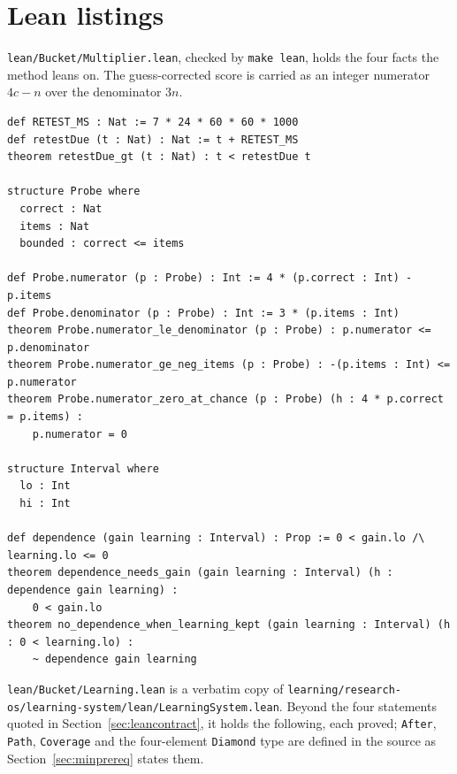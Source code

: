 \documentclass[11pt]{article}
\begin{document}

\section{Lean listings}
\label{app:lean}

\texttt{lean/Bucket/Multiplier.lean}, checked by \texttt{make lean}, holds the four facts the method leans on. The guess-corrected score is carried as an integer numerator $4c - n$ over the denominator $3n$.

\begin{lstlisting}[style=bucketlean]
def RETEST_MS : Nat := 7 * 24 * 60 * 60 * 1000
def retestDue (t : Nat) : Nat := t + RETEST_MS
theorem retestDue_gt (t : Nat) : t < retestDue t

structure Probe where
  correct : Nat
  items : Nat
  bounded : correct <= items

def Probe.numerator (p : Probe) : Int := 4 * (p.correct : Int) - p.items
def Probe.denominator (p : Probe) : Int := 3 * (p.items : Int)
theorem Probe.numerator_le_denominator (p : Probe) : p.numerator <= p.denominator
theorem Probe.numerator_ge_neg_items (p : Probe) : -(p.items : Int) <= p.numerator
theorem Probe.numerator_zero_at_chance (p : Probe) (h : 4 * p.correct = p.items) :
    p.numerator = 0

structure Interval where
  lo : Int
  hi : Int

def dependence (gain learning : Interval) : Prop := 0 < gain.lo /\ learning.lo <= 0
theorem dependence_needs_gain (gain learning : Interval) (h : dependence gain learning) :
    0 < gain.lo
theorem no_dependence_when_learning_kept (gain learning : Interval) (h : 0 < learning.lo) :
    ~ dependence gain learning
\end{lstlisting}

\texttt{lean/\allowbreak Bucket/\allowbreak Learning.\allowbreak lean} is a verbatim copy of \texttt{learning/\allowbreak research-os/\allowbreak learning-system/\allowbreak lean/\allowbreak LearningSystem.\allowbreak lean}. Beyond the four statements quoted in Section~\ref{sec:leancontract}, it holds the following, each proved; \texttt{After}, \texttt{Path}, \texttt{Coverage} and the four-element \texttt{Diamond} type are defined in the source as Section~\ref{sec:minprereq} states them.
\end{document}
